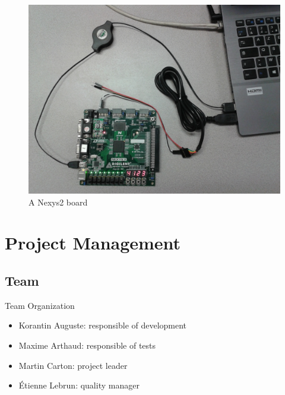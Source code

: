 \documentclass{beamer}
\begin{document}
    \begin{frame}[plain]
      \begin{figure}
        \centering
        \includegraphics[width=\textwidth, keepaspectratio]{fig/Nexys2.jpg}
        \caption{A Nexys2 board}
      \end{figure}
    \end{frame}

  \section{Project Management}
    \subsection{Team}
      \begin{frame}{Team Organization}
        \begin{itemize}
          \item Korantin Auguste: responsible of development
          \item Maxime Arthaud: responsible of tests
          \item Martin Carton: project leader
          \item Étienne Lebrun: quality manager
        \end{itemize}
      \end{frame}
\end{document}
